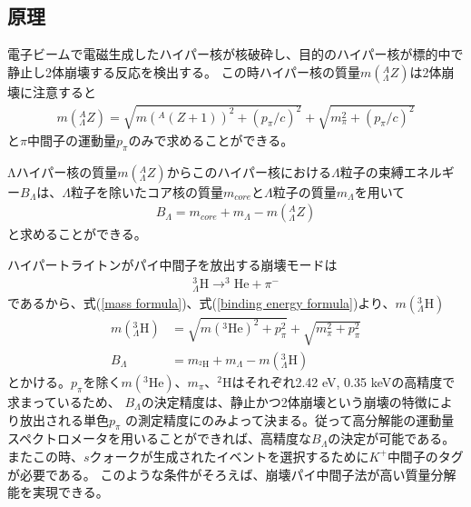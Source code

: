\documentclass[a4paper,11pt,uplatex]{jsbook}
\begin{document}
\subsection{原理}\label{sec:dps principle}
電子ビームで電磁生成したハイパー核が核破砕し、目的のハイパー核が標的中で静止し2体崩壊する反応を検出する。
この時ハイパー核の質量$m(^A_{\Lambda}Z)$は2体崩壊に注意すると
\begin{eqnarray}
  m(^A_{\Lambda}Z) = \sqrt{m(^A(Z+1))^2 + (p_\pi/c)^2} + \sqrt{m_\pi^2 + (p_\pi/c)^2} \label{mass formula}
\end{eqnarray}
と$\pi$中間子の運動量$p_\pi$のみで求めることができる。

Λハイパー核の質量$m(^A_\Lambda Z)$からこのハイパー核における$\Lambda$粒子の束縛エネルギー$B_\Lambda$は、$\Lambda$粒子を除いたコア核の質量$m_{core}$と$\Lambda$粒子の質量$m_\Lambda$を用いて
\begin{eqnarray}
  B_\Lambda = m_{core} + m_\Lambda - m(^A_\Lambda Z) \label{binding energy formula}
\end{eqnarray}
と求めることができる。

ハイパートライトンがパイ中間子を放出する崩壊モードは
\begin{eqnarray}
  ^3_{\Lambda}\text{H} \rightarrow ^3\text{He} + \pi^-
\end{eqnarray}
であるから、式(\ref{mass formula})、式(\ref{binding energy formula})より、$m(^3_\Lambda\text{H})$
\begin{eqnarray}
  m(^3_\Lambda \text{H}) &= \sqrt{m(^3\text{He})^2 + p^2_\pi} + \sqrt{m_\pi^2 + p_\pi^2} \\
  B_\Lambda &= m_{^2\text{H}} + m_\Lambda - m(^3_\Lambda \text{H})
\end{eqnarray}
とかける。$p_\pi$を除く$m(^3\text{He})$、$m_\pi$、$^2\text{H}$はそれぞれ2.42 eV\cite{Audi}, 0.35 keV\cite{Beringer}の高精度で求まっているため、
$B_\Lambda$の決定精度は、静止かつ2体崩壊という崩壊の特徴により放出される単色$p_\pi$
の測定精度にのみよって決まる。従って高分解能の運動量スペクトロメータを用いることができれば、高精度な$B_\Lambda$の決定が可能である。またこの時、$s$クォークが生成されたイベントを選択するために$K^+$中間子のタグが必要である。
このような条件がそろえば、崩壊パイ中間子法が高い質量分解能を実現できる。
\end{document}
